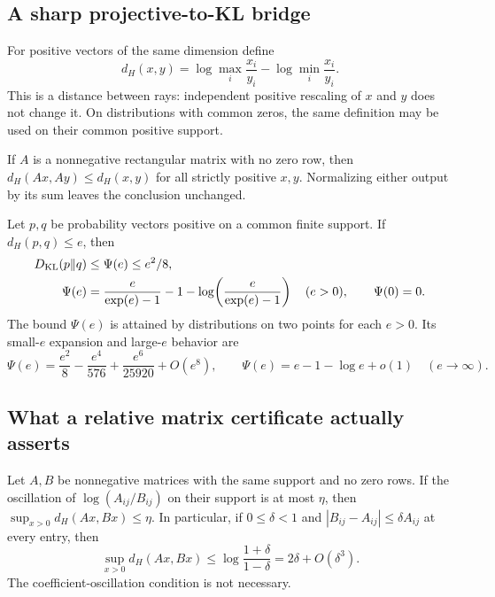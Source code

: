 \subsection{A sharp projective-to-KL bridge}
For positive vectors of the same dimension define
\[
 d_H(x,y)=\log\max_i\frac{x_i}{y_i}
          -\log\min_i\frac{x_i}{y_i}.
\]
This is a distance between rays: independent positive rescaling of
$x$ and $y$ does not change it. On distributions with common zeros,
the same definition may be used on their common positive support.

\begin{lemma}
\label{II:M:lem:projective-nonexpansive}
If $A$ is a nonnegative rectangular matrix with no zero row, then
$d_H(Ax,Ay)\le d_H(x,y)$ for all strictly positive $x,y$.
Normalizing either output by its sum leaves the conclusion unchanged.
\end{lemma}


\begin{lemma}
\label{II:M:lem:sharp-projective-kl}
Let $p,q$ be probability vectors positive on a common finite support.
If $d_H(p,q)\le e$, then
\begin{align}
 D_{\rm KL}(p\|q)&\le\Psi(e)\le e^2/8,\label{II:M:eq:sharp-projective-kl}\\
 \Psi(e)&=\frac{e}{\exp(e)-1}-1
          -\log\!\left(\frac{e}{\exp(e)-1}\right)\quad(e>0),
 \qquad \Psi(0)=0.\nonumber
\end{align}
The bound $\Psi(e)$ is attained by distributions on two points for each
$e>0$. Its small-$e$ expansion and large-$e$ behavior are
\[
 \Psi(e)=\frac{e^2}{8}-\frac{e^4}{576}
                 +\frac{e^6}{25920}+O(e^8),\qquad
 \Psi(e)=e-1-\log e+o(1)\quad(e\to\infty).
\]
\end{lemma}


\subsection{What a relative matrix certificate actually asserts}
\begin{proposition}
\label{II:M:prop:relative-projective-certificate}
Let $A,B$ be nonnegative matrices with the same support and no zero
rows. If the oscillation of $\log(A_{ij}/B_{ij})$ on their support is
at most $\eta$, then $\sup_{x>0}d_H(Ax,Bx)\le\eta$.
In particular, if $0\le\delta<1$ and
$|B_{ij}-A_{ij}|\le\delta A_{ij}$ at every entry, then
\[
 \sup_{x>0}d_H(Ax,Bx)
 \le\log\frac{1+\delta}{1-\delta}
 =2\delta+O(\delta^3).
\]
The coefficient-oscillation condition is not necessary.
\end{proposition}


